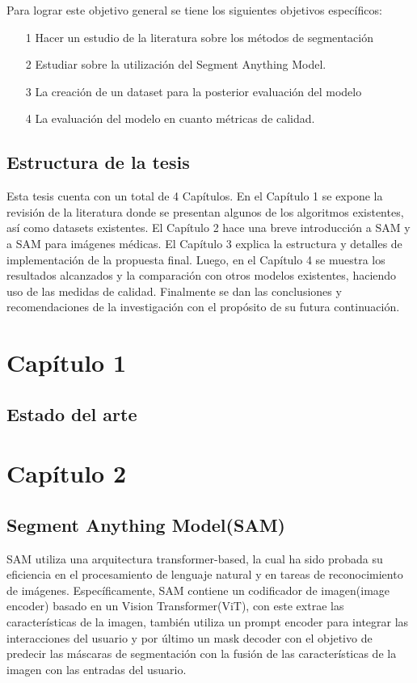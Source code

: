 \documentclass[12pt]{article}
\begin{document}
	
	Para lograr este objetivo general se tiene los siguientes objetivos espec\'ificos:
	
	\begin{itemize}
		\item[1] Hacer un estudio de la literatura sobre los m\'etodos de segmentaci\'on
		\item[2] Estudiar sobre la utilizaci\'on del Segment Anything Model.
		\item[3] La creaci\'on de un dataset para la posterior evaluaci\'on del modelo
		\item[4] La evaluaci\'on del modelo en cuanto m\'etricas de calidad. 
	\end{itemize}
	
	\subsection{Estructura de la tesis}
	Esta tesis cuenta con un total de 4 Capítulos. En el Capítulo 1 se expone
	la revisión de la literatura donde se presentan algunos de los algoritmos existentes, as\'i como datasets existentes. El Capítulo 2 hace una breve introducci\'on a SAM y a SAM para im\'agenes m\'edicas. El Cap\'itulo 3 explica la estructura y detalles de implementaci\'on de la propuesta final. Luego, en el Cap\'itulo 4 se muestra los resultados alcanzados y la comparaci\'on con otros modelos existentes, haciendo uso de las medidas de calidad. Finalmente se dan las
	conclusiones y recomendaciones de la investigación con el propósito de su
	futura continuación.

	
	
	
	\newpage
	
	\section{Cap\'itulo 1}
		\subsection{Estado del arte}
	
	
	\newpage
	
	\section{Cap\'itulo 2}
		\subsection{Segment Anything Model(SAM)}
		SAM utiliza una arquitectura transformer-based, la cual ha sido probada su eficiencia en el procesamiento de lenguaje natural y en tareas de reconocimiento de im\'agenes. Espec\'ificamente, SAM contiene un codificador de imagen(image encoder) basado en un Vision Transformer(ViT), con este extrae las caracter\'isticas de la imagen, tambi\'en utiliza un prompt encoder para integrar las interacciones del usuario y por \'ultimo un mask decoder con el objetivo de predecir las m\'ascaras de segmentaci\'on con la fusi\'on de las caracter\'isticas de la imagen con las entradas del usuario.
		
\end{document}
